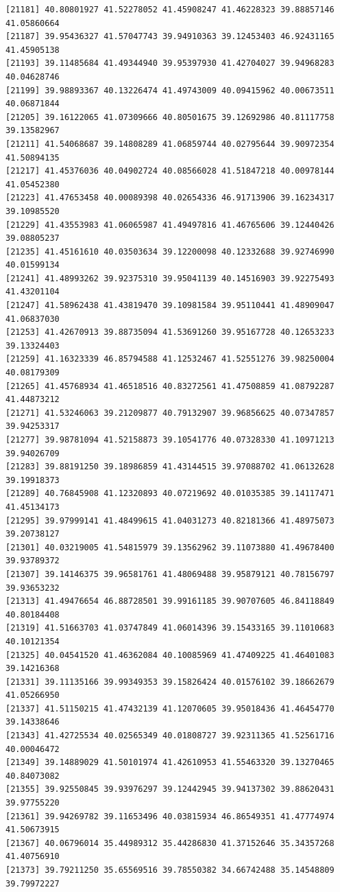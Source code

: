 \documentclass[
  letterpaper,
  DIV=11,
  numbers=noendperiod]{scrartcl}
\begin{document}
\begin{verbatim}
[21181] 40.80801927 41.52278052 41.45908247 41.46228323 39.88857146 41.05860664
[21187] 39.95436327 41.57047743 39.94910363 39.12453403 46.92431165 41.45905138
[21193] 39.11485684 41.49344940 39.95397930 41.42704027 39.94968283 40.04628746
[21199] 39.98893367 40.13226474 41.49743009 40.09415962 40.00673511 40.06871844
[21205] 39.16122065 41.07309666 40.80501675 39.12692986 40.81117758 39.13582967
[21211] 41.54068687 39.14808289 41.06859744 40.02795644 39.90972354 41.50894135
[21217] 41.45376036 40.04902724 40.08566028 41.51847218 40.00978144 41.05452380
[21223] 41.47653458 40.00089398 40.02654336 46.91713906 39.16234317 39.10985520
[21229] 41.43553983 41.06065987 41.49497816 41.46765606 39.12440426 39.08805237
[21235] 41.45161610 40.03503634 39.12200098 40.12332688 39.92746990 40.01599134
[21241] 41.48993262 39.92375310 39.95041139 40.14516903 39.92275493 41.43201104
[21247] 41.58962438 41.43819470 39.10981584 39.95110441 41.48909047 41.06837030
[21253] 41.42670913 39.88735094 41.53691260 39.95167728 40.12653233 39.13324403
[21259] 41.16323339 46.85794588 41.12532467 41.52551276 39.98250004 40.08179309
[21265] 41.45768934 41.46518516 40.83272561 41.47508859 41.08792287 41.44873212
[21271] 41.53246063 39.21209877 40.79132907 39.96856625 40.07347857 39.94253317
[21277] 39.98781094 41.52158873 39.10541776 40.07328330 41.10971213 39.94026709
[21283] 39.88191250 39.18986859 41.43144515 39.97088702 41.06132628 39.19918373
[21289] 40.76845908 41.12320893 40.07219692 40.01035385 39.14117471 41.45134173
[21295] 39.97999141 41.48499615 41.04031273 40.82181366 41.48975073 39.20738127
[21301] 40.03219005 41.54815979 39.13562962 39.11073880 41.49678400 39.93789372
[21307] 39.14146375 39.96581761 41.48069488 39.95879121 40.78156797 39.93653232
[21313] 41.49476654 46.88728501 39.99161185 39.90707605 46.84118849 40.80184408
[21319] 41.51663703 41.03747849 41.06014396 39.15433165 39.11010683 40.10121354
[21325] 40.04541520 41.46362084 40.10085969 41.47409225 41.46401083 39.14216368
[21331] 39.11135166 39.99349353 39.15826424 40.01576102 39.18662679 41.05266950
[21337] 41.51150215 41.47432139 41.12070605 39.95018436 41.46454770 39.14338646
[21343] 41.42725534 40.02565349 40.01808727 39.92311365 41.52561716 40.00046472
[21349] 39.14889029 41.50101974 41.42610953 41.55463320 39.13270465 40.84073082
[21355] 39.92550845 39.93976297 39.12442945 39.94137302 39.88620431 39.97755220
[21361] 39.94269782 39.11653496 40.03815934 46.86549351 41.47774974 41.50673915
[21367] 40.06796014 35.44989312 35.44286830 41.37152646 35.34357268 41.40756910
[21373] 39.79211250 35.65569516 39.78550382 34.66742488 35.14548809 39.79972227

\end{verbatim}
\end{document}
